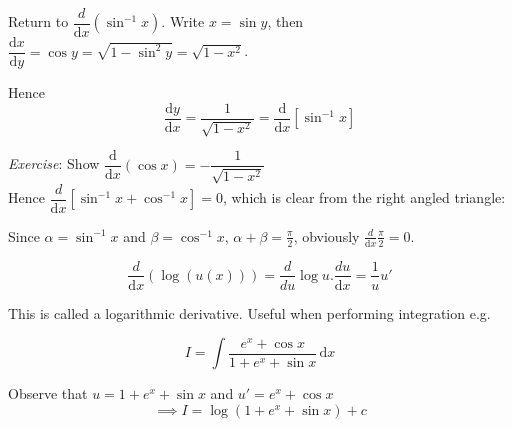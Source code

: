 \documentclass[10pt]{scrartcl}
\begin{document}
Return to $\dfrac{d}{\mathrm{d}x}(\sin^{-1}x).$ Write $x = \sin y$, then $\dfrac{\mathrm{d}x}{\mathrm{d}y} = \cos y = \sqrt{1 - \sin^2y} = \sqrt{1 - x^2}$.

Hence \[\boxed{\dfrac{\mathrm{d}y}{\mathrm{d}x} = \dfrac{1}{\sqrt{1-x^2}} = \dfrac{\mathrm{d}}{\mathrm{d}x}[\sin^{-1}x]}\]

\emph{Exercise}: Show $\dfrac{\mathrm{d}}{\mathrm{d}x}(\cos x) = -\dfrac{1}{\sqrt{1-x^2}}$\\

Hence $\dfrac{d}{\mathrm{d}x}[\sin^{-1}x + \cos^{-1}x] = 0$, which is clear from the right angled triangle: \begin{center}
	
\end{center}
Since $\alpha = \sin^{-1}x$ and $\beta = \cos^{-1}x$, $\alpha + \beta = \frac{\pi}{2}$, obviously $\frac{d}{\mathrm{d}x} \frac{\pi}{2} = 0$.\\




\[\displaystyle{
\frac{d}{\mathrm{d}x}(\log(u(x))) = \frac{d}{du}\log u.\frac{du}{\mathrm{d}x} = \frac{1}{u}u'
}\]

This is called a logarithmic derivative. Useful when performing integration e.g.

\[\displaystyle{
I = \int \frac{e^x + \cos x}{1 + e^x + \sin x} \, \mathrm{d}x
}\]

Observe that $u = 1 + e^x + \sin x$ and $u' = e^x + \cos x$
\[\implies I = \log(1 + e^x + \sin x) + c\]
\end{document}
